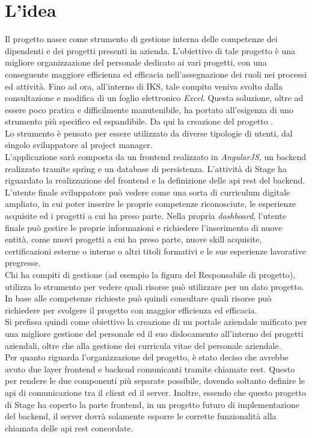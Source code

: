 
\section{L'idea}

Il progetto \myTitle{} nasce come strumento di gestione interna delle competenze dei dipendenti e dei progetti presenti in azienda. L'obiettivo di tale progetto è una migliore organizzazione del personale dedicato ai vari progetti, con una conseguente maggiore efficienza ed efficacia nell'assegnazione dei ruoli nei processi ed attività. Fino ad ora, all'interno di IKS, tale compito veniva svolto dalla consultazione e modifica di un foglio elettronico \emph{Excel}. Questa soluzione, oltre ad essere poco pratica e difficilmente manutenibile, ha portato all'esigenza di uno strumento più specifico ed espandibile. Da qui la creazione del progetto \myTitle{}.\\
Lo strumento \myTitle{} è pensato per essere utilizzato da diverse tipologie di utenti, dal singolo sviluppatore al project manager.\\
L'applicazione sarà composta da un \gls{frontend} realizzato in \emph{AngularJS}, un \gls{backend} realizzato tramite \gls{spring} e un database di persistenza. L'attività di Stage ha riguardato la realizzazione del frontend e la definizione delle \gls{api} \gls{rest} del backend.\\
L'utente finale sviluppatore può vedere \myTitle{} come una sorta di curriculum digitale ampliato, in cui poter inserire le proprie competenze riconosciute, le esperienze acquisite ed i progetti a cui ha preso parte. Nella propria \emph{dashboard}, l'utente finale può gestire le proprie informazioni e richiedere l'inserimento di nuove entità, come nuovi progetti a cui ha preso parte, nuove skill acquisite, certificazioni esterne o interne o altri titoli formativi e le sue esperienze lavorative pregresse.\\ 
Chi ha compiti di gestione (ad esempio la figura del Responsabile di progetto), utilizza lo strumento per vedere quali risorse può utilizzare per un dato progetto. In base alle competenze richieste può quindi consultare quali risorse può richiedere per svolgere il progetto con maggior efficienza ed efficacia.\\ 
Si prefissa quindi come obiettivo la creazione di un portale aziendale unificato per una migliore gestione del personale ed il suo dislocamento all’interno dei progetti aziendali, oltre che alla gestione dei curricula vitae del personale aziendale.\\
Per quanto riguarda l'organizzazione del progetto, è stato deciso che \myTitle{} avrebbe avuto due layer \gls{frontend} e \gls{backend} comunicanti tramite chiamate \gls{rest}. Questo per rendere le due componenti più separate possibile, dovendo soltanto definire le \gls{api} di comunicazione tra il client ed il server. Inoltre, essendo che questo progetto di Stage ha coperto la parte \gls{frontend}, in un progetto futuro di implementazione del \gls{backend}, il server dovrà solamente esporre le corrette funzionalità alla chiamata delle \gls{api} \gls{rest} concordate.




